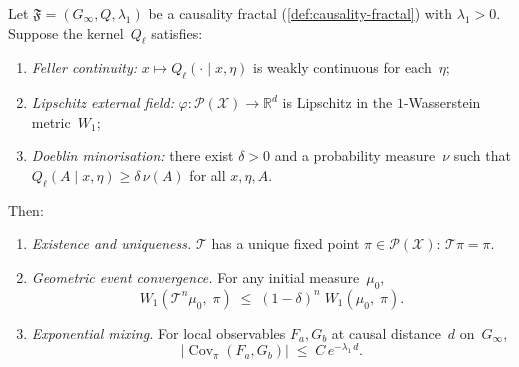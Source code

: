 \begin{theorem}
\label{thm:fractal-convergence}
Let $\mathfrak{F} = (G_\infty, Q, \lambda_1)$ be a causality
fractal (\cref{def:causality-fractal}) with
$\lambda_1 > 0$.  Suppose the kernel~$Q_\ell$ satisfies:
\begin{enumerate}[label=\textup{(A\arabic*)},nosep]
  \item\label{a:feller} \emph{Feller continuity:}
  $x \mapsto Q_\ell(\cdot \mid x, \eta)$ is weakly continuous
  for each~$\eta$;
  \item\label{a:lip} \emph{Lipschitz external field:}
  $\varphi \colon \mathcal{P}(\mathcal{X}) \to \mathbb{R}^d$
  is Lipschitz in the $1$-Wasserstein metric~$W_1$;
  \item\label{a:doeblin} \emph{Doeblin minorisation:} there
  exist $\delta > 0$ and a probability measure~$\nu$ such that
  $Q_\ell(A \mid x, \eta) \ge \delta\,\nu(A)$ for all
  $x, \eta, A$.
\end{enumerate}
Then:
\begin{enumerate}[label=\textup{(\roman*)},nosep]
  \item \emph{Existence and uniqueness.}
  $\mathcal{T}$ has a unique fixed point
  $\pi \in \mathcal{P}(\mathcal{X})$: \;$\mathcal{T}\pi = \pi$.
  \item \emph{Geometric event convergence.}
  For any initial measure~$\mu_0$,
  \begin{equation}\label{eq:event-conv}
    W_1(\mathcal{T}^n \mu_0,\;\pi)
    \;\leq\;
    (1 - \delta)^{n}\; W_1(\mu_0,\;\pi).
  \end{equation}
  \item \emph{Exponential mixing.}
  For local observables $F_a, G_b$ at causal distance~$d$
  on~$G_\infty$,
  \begin{equation}\label{eq:exp-mixing}
    \lvert\operatorname{Cov}_\pi(F_a, G_b)\rvert
    \;\leq\;
    C\,e^{-\lambda_1\, d}.
  \end{equation}
\end{enumerate}
\end{theorem}

